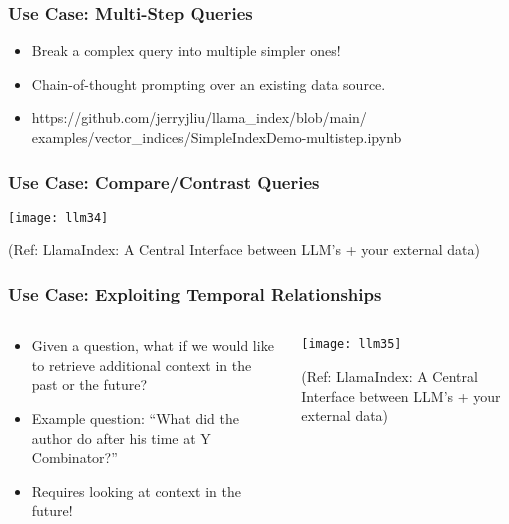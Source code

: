 \begin{frame}[fragile]\frametitle{Use Case: Multi-Step Queries}

\begin{itemize}
\item Break a complex query into multiple simpler ones! 
\item Chain-of-thought prompting over an existing data source.
\item https://github.com/jerryjliu/llama\_index/blob/main/
examples/vector\_indices/SimpleIndexDemo-multistep.ipynb
\end{itemize}	

\end{frame}


\begin{frame}[fragile]\frametitle{Use Case: Compare/Contrast Queries}


\begin{center}
\texttt{[image: llm34]}

{\tiny (Ref: LlamaIndex: A Central Interface between LLM’s + your external data)}
\end{center}
\end{frame}


\begin{frame}[fragile]\frametitle{Use Case: Exploiting Temporal Relationships}

\begin{columns}
    \begin{column}[T]{0.4\linewidth}
		\begin{itemize}
		\item Given a question, what if we would like to retrieve additional context in the past or the future?
		\item Example question: “What did the author do after his time at Y Combinator?” 
		\item Requires looking at context in the future! 
		\end{itemize}	
    \end{column}
    \begin{column}[T]{0.6\linewidth}
		\begin{center}
		\texttt{[image: llm35]}

		{\tiny (Ref: LlamaIndex: A Central Interface between LLM’s + your external data)}
		\end{center}
    \end{column}
  \end{columns}
\end{frame}


